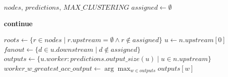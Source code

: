 \begin{algorithm}
    \caption{Worker Assignment Algorithm (used by Uniform and Non-Uniform planners)}
    \label{alg:worker_assignment}
    \small
    \begin{algorithmic}[1]
    \Require $nodes$, $predictions$, $MAX\_CLUSTERING$
    \State $assigned \gets \emptyset$
    
            \State \textbf{continue}
        \EndIf
        
         
            \State $roots \gets \{r \in nodes \mid r.upstream = \emptyset \land r \notin assigned\}$
            \State {}
         
            \State $u \gets n.upstream[0]$
                \State {} 
            \Else {}
                \State $fanout \gets \{d \in u.downstream \mid d \notin assigned\}$
                \State {}
            \EndIf
        \Else {}
            \State $outputs \gets \{u.worker: predictions.output\_size(u) \mid u \in n.upstream\}$
            \State $worker\_w\_greatest\_acc\_output \gets \arg\max_{w \in outputs} outputs[w]$
            \State {}
        \EndIf
    \EndFor
    \end{algorithmic}
\end{algorithm}



